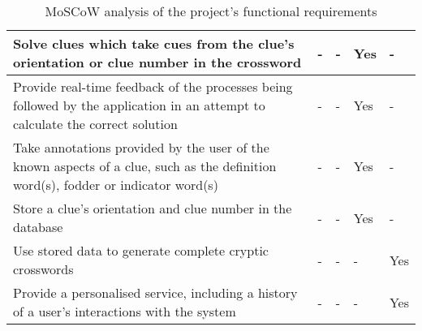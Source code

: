 \begin{table}[H]
\begin{tabular}{|p{9.3cm}|p{1.3cm}|p{1.3cm}|p{1.3cm}|p{1.3cm}|}
    Solve clues which take cues from the clue's orientation or clue number in the crossword &
    - & - & Yes & - \\ \hline

    Provide real-time feedback of the processes being followed by the application in an attempt to calculate the correct solution &
    - & - & Yes & - \\ \hline

    Take annotations provided by the user of the known aspects of a clue, such as the definition word(s), fodder or indicator word(s) &
    - & - & Yes & - \\ \hline

    Store a clue's orientation and clue number in the database &
    - & - & Yes & - \\ \hline

    Use stored data to generate complete cryptic crosswords &
    - & - & - & Yes \\ \hline

    Provide a personalised service, including a history of a user's interactions with the system &
    - & - & - & Yes \\ \hline

    \end{tabular}
    \caption {MoSCoW analysis of the project's functional requirements}
\end{table}